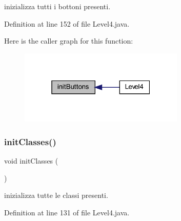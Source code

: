 inizializza tutti i bottoni presenti. 



Definition at line 152 of file Level4.\+java.

Here is the caller graph for this function\+:\nopagebreak
\begin{figure}[H]
\begin{center}
\leavevmode
\includegraphics[width=223pt]{classscenes_1_1_level4_a27d3ba5afb772cc36c9a432c28975ace_icgraph}
\end{center}
\end{figure}
\mbox{\label{classscenes_1_1_level4_afe125d345675ffefe8da7e96d39773f3}} 
\subsubsection{\texorpdfstring{init\+Classes()}{initClasses()}}
{\footnotesize\ttfamily void init\+Classes (\begin{DoxyParamCaption}{ }\end{DoxyParamCaption})}



inizializza tutte le classi presenti. 



Definition at line 131 of file Level4.\+java.

